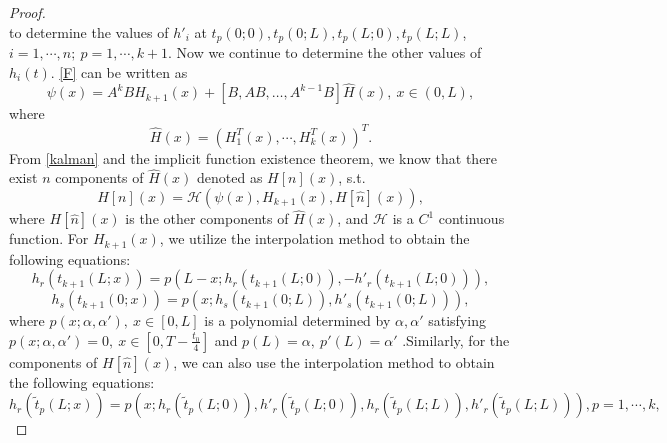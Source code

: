 \documentclass[a4paper,reqno,11pt]{amsart}
\numberwithin{equation}{section} %
\begin{document}
\begin{proof}
\begin{equation}
\end{equation}
to determine the values of $h'_i$ at $t_p(0;0),t_p(0;L),t_p(L;0),t_p(L;L)$,$i=1,\cdots,n;\ p=1,\cdots,k+1$.
Now we continue to determine the other values of $h_i(t)$. \eqref{F} can be written as
\begin{equation}\label{G}
    \psi\left( x \right) =A^kBH_{k+1}\left( x \right) +\left[B, AB, \ldots, A^{k-1} B\right] \hat{H}(x)  ,\ x\in \left( 0,L \right),
\end{equation}
where 
$$
\hat{H}(x)=\left( H^T_1\left( x \right) ,\cdots ,H^T_k\left( x \right) \right)^T .
$$
From \eqref{kalman} and the implicit function existence theorem, we know that there exist $n$ components of $\hat{H}(x)$ denoted as $H[n](x) $, s.t.
\begin{equation}\label{H}
H\left[ n \right] \left( x \right) =\mathcal{H} \left( \psi\left( x \right) ,H_{k+1}\left( x \right) ,H\left[ \hat{n} \right] \left( x \right) \right) ,
\end{equation}
where $H\left[ \hat{n} \right] \left( x \right)$ is the other components of $\hat{H}(x)$, and $\mathcal{H}$ is a $C^1$ continuous function. For $H_{k+1}\left( x \right) $, we utilize the interpolation method to obtain the following equations:
\begin{equation}\label{polynomial k+1 r}
h_r\left( t_{k+1}\left( L;x \right) \right) =p\left( L-x;h_r\left( t_{k+1}\left( L;0 \right) \right) ,-h'_r\left( t_{k+1}\left( L;0 \right) \right) \right) ,
\end{equation}
\begin{equation}\label{polynomial k+1 s}
	h_s\left( t_{k+1}\left( 0;x \right) \right) =p\left( x;h_s\left( t_{k+1}\left( 0;L \right) \right) ,h'_s\left( t_{k+1}\left( 0;L \right) \right) \right) ,
\end{equation}
where $p(x;\alpha ,\alpha  ') ,\ x \in [0,L]$ is a polynomial determined by $\alpha ,\alpha  '$ satisfying $p(x;\alpha ,\alpha  ') =0, \  x \in [0,T-\frac{t_0}{4}]$ and $p(L)=\alpha ,\ p'(L)=\alpha  '$ .Similarly, for the components of $H\left[ \hat{n} \right] \left( x \right)$, we can also use the interpolation method to obtain the following equations:
\begin{equation}\label{polynomial p r}
	h_r\left( \tilde{t}_p\left( L;x \right) \right) =p\left( x;h_r\left( \tilde{t}_p\left( L;0 \right) \right) ,h'_r\left( \tilde{t}_p\left( L;0 \right) \right) ,h_r\left( \tilde{t}_p\left( L;L \right) \right) ,h'_r\left( \tilde{t}_p\left( L;L \right) \right) \right) ,p=1,\cdots,k,
\end{equation}

\end{proof}
\end{document}
